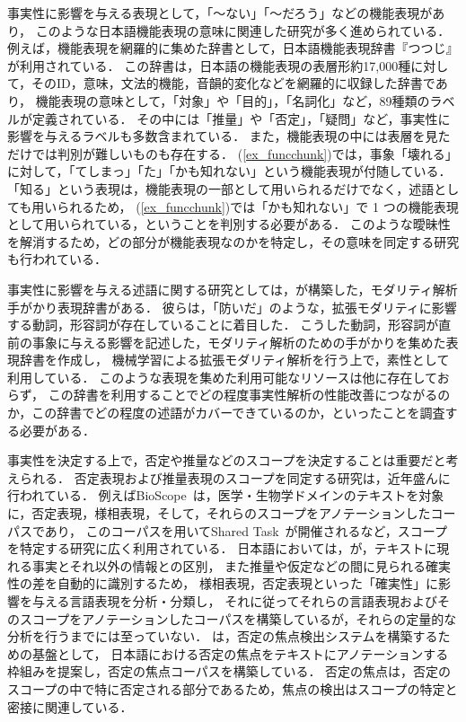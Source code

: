 \documentclass[japanese]{jnlp_1.4}
\let\underline
\def\event#1{}
\begin{document}
事実性に影響を与える表現として，「〜ない」「〜だろう」などの機能表現があり，
このような日本語機能表現の意味に関連した研究が多く進められている．
例えば，機能表現を網羅的に集めた辞書として，日本語機能表現辞書『つつじ』\cite{Matsuyoshi2007}が利用されている．
この辞書は，日本語の機能表現の表層形約17,000種に対して，そのID，意味，文法的機能，音韻的変化などを網羅的に収録した辞書であり，
機能表現の意味として，「対象」や「目的」，「名詞化」など，89種類のラベルが定義されている．
その中には「推量」や「否定」，「疑問」など，事実性に影響を与えるラベルも多数含まれている．
また，機能表現の中には表層を見ただけでは判別が難しいものも存在する．
\enumsentence{
パソコンが\event{壊れ}\underline{てしまったかも知れない}。
} \label{ex_funcchunk}
(\ref{ex_funcchunk})では，事象「壊れる」に対して，「てしまっ」「た」「かも知れない」という機能表現が付随している．
「知る」という表現は，機能表現の一部として用いられるだけでなく，述語としても用いられるため，
(\ref{ex_funcchunk})では「かも知れない」で 1 つの機能表現として用いられている，ということを判別する必要がある．
このような曖昧性を解消するため，どの部分が機能表現なのかを特定し，その意味を同定する研究も行われている\cite{Suzuki2011,Imamura2011,Kamioka2015}．

事実性に影響を与える述語に関する研究としては，が構築した，モダリティ解析手がかり表現辞書がある．
彼らは，「防いだ」のような，拡張モダリティに影響する動詞，形容詞が存在していることに着目した．
こうした動詞，形容詞が直前の事象に与える影響を記述した，モダリティ解析のための手がかりを集めた表現辞書を作成し，
機械学習による拡張モダリティ解析を行う上で，素性として利用している．
このような表現を集めた利用可能なリソースは他に存在しておらず，
この辞書を利用することでどの程度事実性解析の性能改善につながるのか，この辞書でどの程度の述語がカバーできているのか，といったことを調査する必要がある．

事実性を決定する上で，否定や推量などのスコープを決定することは重要だと考えられる．
否定表現および推量表現のスコープを同定する研究は，近年盛んに行われている．
例えばBioScope~\cite{Szarvas2008}は，医学・生物学ドメインのテキストを対象に，否定表現，様相表現，そして，それらのスコープをアノテーションしたコーパスであり，
このコーパスを用いてShared Task~\cite{CoNLL2010,SEM2012}が開催されるなど，スコープを特定する研究に広く利用されている．
日本語においては，が，テキストに現れる事実とそれ以外の情報との区別，
また推量や仮定などの間に見られる確実性の差を自動的に識別するため，
様相表現，否定表現といった「確実性」に影響を与える言語表現を分析・分類し，
それに従ってそれらの言語表現およびそのスコープをアノテーションしたコーパスを構築しているが，それらの定量的な分析を行うまでには至っていない．
は，否定の焦点検出システムを構築するための基盤として，
日本語における否定の焦点をテキストにアノテーションする枠組みを提案し，否定の焦点コーパスを構築している．
否定の焦点は，否定のスコープの中で特に否定される部分であるため，焦点の検出はスコープの特定と密接に関連している．
\end{document}

